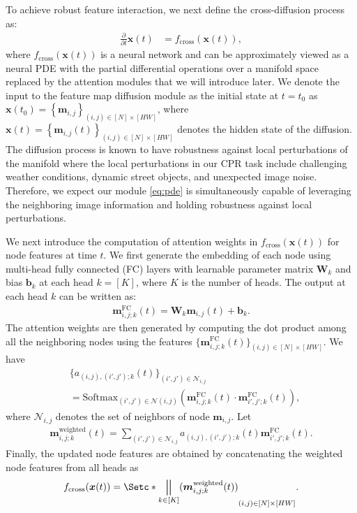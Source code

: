 \documentclass[letterpaper]{article} \usepackage{aaai23}  \usepackage{times}  \usepackage{helvet}  \usepackage{courier}  \usepackage[hyphens]{url}  \usepackage{graphicx} \urlstyle{rm} \def\UrlFont{\rm}  \usepackage{natbib}  \usepackage{caption} \frenchspacing  \setlength{\pdfpagewidth}{8.5in} \setlength{\pdfpageheight}{11in} \usepackage{booktabs}
\theoremstyle{remark}
\theoremstyle{plain}
\newcommand{\nn}{\nonumber\\ }
\newcommand{\mbb}{\bm{b}}
\newcommand{\mbm}{\bm{m}}
\newcommand{\mbW}{\bm{W}}
\newcommand{\mbx}{\bm{x}}
\DeclareMathOperator*{\concat}{\scalerel*{\parallel}{\sum}}
\begin{document}
To achieve robust feature interaction, we next define the cross-diffusion process as: 
\begin{align}
\frac{\partial}{\partial t} \mbx(t)
& = f_{\mathrm{cross}}(\mbx(t)), \label{eq:pde}
\end{align}
where $f_{\mathrm{cross}}(\mbx(t))$ is a neural network and can be approximately viewed as a neural PDE  with the partial differential operations over a manifold space replaced by the attention modules that we will introduce later. We denote the input to the feature map diffusion module as the initial state at $t=t_{0}$ as $\mbx(t_{0})=\left\{\mbm_{i,j}\right\}_{(i,j)\in [N]\times[HW]}$, where $\mbx(t)=\left\{\mbm_{i,j}(t)\right\}_{(i,j)\in [N]\times[HW]}$ denotes the hidden state of the diffusion.
The diffusion process is known to have robustness against local perturbations of the manifold \cite{chen1998stability} where the local perturbations in our CPR task include challenging weather conditions, dynamic street objects, and unexpected image noise. Therefore, we expect our module \cref{eq:pde} is simultaneously capable of leveraging the neighboring image information and holding robustness against local perturbations.



We next introduce the computation of attention weights in $f_{\mathrm{cross}}(\mbx(t))$ for node features at time $t$. 
We first generate the embedding of each node using multi-head fully connected (FC) layers with learnable parameter matrix $\mbW_{k}$ and bias $\mbb_{k}$ at each head $k=[K]$, where $K$ is the number of heads. The output at each head $k$ can be written as:
\begin{align}
\mbm_{i,j;k}^{\mathrm{FC}}(t)=\mbW_{k} \mbm_{i,j}(t) + \mbb_{k}.
\end{align}
The attention weights are then generated by computing the dot product among all the neighboring nodes using the features 
$\bigl\{\mbm_{i,j;k}^{\mathrm{FC}}(t)\bigr\}_{(i,j)\in[N]\times[HW]}$. We have
\begin{align}
& \{a_{(i,j),(i',j');k}(t)\}_{(i',j')\in \mathcal{N}_{i,j}} \nn
& =\mathrm{Softmax}_{(i',j') \in \mathcal{N}(i,j)}(\mbm_{i,j;k}^{\mathrm{FC}}(t) \cdot  \mbm_{i', j';k}^{\mathrm{FC}}(t)),
\end{align}
where $\mathcal{N}_{i,j}$ denotes the set of neighbors of node $\mbm_{i,j}$.  
Let
\begin{align}
\mbm_{i,j;k}^{\mathrm{weighted}}(t)= \sum_{(i',j') \in \mathcal{N}_{i,j}} a_{(i,j),(i',j');k}(t) \mbm_{i',j';k}^{\mathrm{FC}}(t).
\end{align} Finally, the updated node features are obtained by concatenating the weighted node features from all heads as 
\begin{align}
f_{\mathrm{cross}}(\mbx(t))=\set*{ \concat_{k\in[K]}(\mbm_{i,j;k}^{\mathrm{weighted}}(t)) }_{(i,j)\in [N]\times[HW]}.
\end{align}
\end{document}
